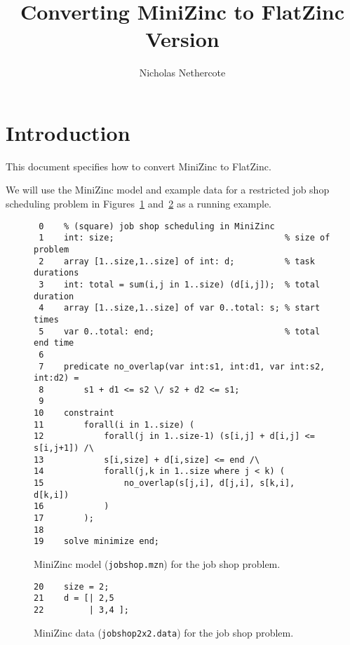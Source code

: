 \documentclass[10pt]{article}
\title{Converting MiniZinc to FlatZinc \\
\smallskip
\Large{Version \mznversion}
}
\author{Nicholas Nethercote}
\date{}
\begin{document}
\maketitle              %

\section{Introduction}
This document specifies how to convert MiniZinc to FlatZinc.

We will use the MiniZinc model and example data for a restricted job shop
scheduling problem in Figures~\ref{MiniZinc model} and~\ref{MiniZinc data}
as a running example.

\begin{figure}[t]
\begin{verbatim}
 0    % (square) job shop scheduling in MiniZinc
 1    int: size;                                  % size of problem
 2    array [1..size,1..size] of int: d;          % task durations
 3    int: total = sum(i,j in 1..size) (d[i,j]);  % total duration
 4    array [1..size,1..size] of var 0..total: s; % start times
 5    var 0..total: end;                          % total end time
 6
 7    predicate no_overlap(var int:s1, int:d1, var int:s2, int:d2) =
 8        s1 + d1 <= s2 \/ s2 + d2 <= s1;
 9
10    constraint
11        forall(i in 1..size) (
12            forall(j in 1..size-1) (s[i,j] + d[i,j] <= s[i,j+1]) /\
13            s[i,size] + d[i,size] <= end /\
14            forall(j,k in 1..size where j < k) (
15                no_overlap(s[j,i], d[j,i], s[k,i], d[k,i])
16            )
17        );
18
19    solve minimize end;
\end{verbatim}
\caption{MiniZinc model (\texttt{jobshop.mzn}) for the job shop problem.}
\label{MiniZinc model}
\end{figure}

\begin{figure}[t]
\begin{verbatim}
20    size = 2;
21    d = [| 2,5
22         | 3,4 ];
\end{verbatim}
\caption{MiniZinc data (\texttt{jobshop2x2.data}) for the job shop problem.}
\label{MiniZinc data}
\end{figure}
\end{document}
